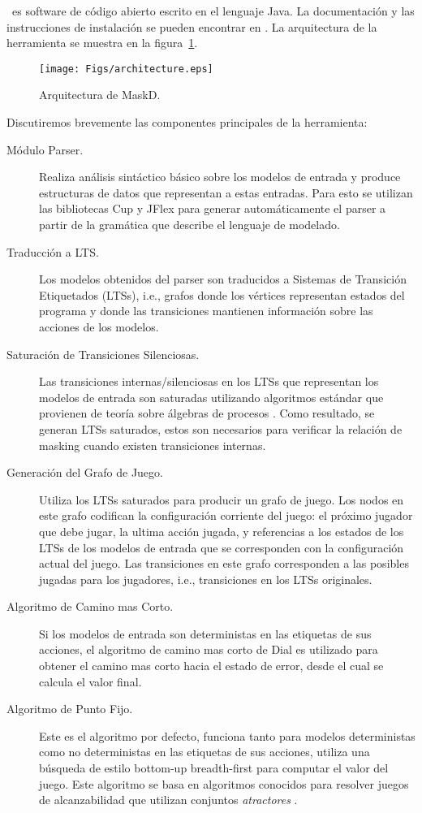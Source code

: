 \MaskD~es software de código abierto escrito en el lenguaje \textsf{Java}. La documentación y las instrucciones de instalación se pueden encontrar en \cite{MaskD}. La arquitectura de la herramienta se muestra en la figura~\ref{fig:arch}.
\begin{figure}[t]
    \centering
    \texttt{[image: Figs/architecture.eps]}
    \caption{Arquitectura de \textsf{MaskD}.}\label{fig:arch}
\end{figure}
    Discutiremos brevemente las componentes principales de la herramienta:
\begin{description}
    \item[Módulo Parser.] Realiza análisis sintáctico básico sobre los modelos de entrada y produce estructuras de datos que representan a  estas entradas. Para esto se utilizan las bibliotecas \textsf{Cup} y 
    \textsf{JFlex} para generar automáticamente el parser a partir de la gramática que describe el lenguaje de modelado.
    \item[Traducción a LTS.] Los modelos obtenidos del parser son traducidos a Sistemas de Transición Etiquetados (LTSs), i.e., 
    grafos donde los vértices representan estados del programa y donde las transiciones mantienen información sobre las acciones de los modelos. 
    \item[Saturación de Transiciones Silenciosas.] Las transiciones internas/silenciosas en los LTSs que representan los modelos de entrada son saturadas utilizando algoritmos estándar que provienen de teoría sobre álgebras de procesos \cite{Milner89}. Como resultado, se generan LTSs saturados, estos son necesarios para verificar la relación de masking cuando existen transiciones internas.
    \item[Generación del Grafo de Juego.] Utiliza los LTSs saturados para producir un grafo de juego. Los nodos en este grafo codifican la configuración corriente del juego: 
    el próximo jugador que debe jugar, la ultima acción jugada, y referencias a los estados de los LTSs de los modelos de entrada que se corresponden con la configuración actual del juego. 
    Las transiciones en este grafo corresponden a las posibles jugadas para los jugadores, i.e.,  transiciones en los LTSs originales.
    \item[Algoritmo de Camino mas Corto.] Si los modelos de entrada son deterministas en las etiquetas de sus acciones, el algoritmo de camino mas corto de Dial es utilizado para obtener el camino mas corto hacia el estado de error, desde el cual se calcula el valor final.
    \item[Algoritmo de Punto Fijo.] Este es el algoritmo por defecto, funciona tanto para modelos deterministas como no deterministas en las etiquetas de sus acciones, utiliza una búsqueda de estilo bottom-up breadth-first para computar el valor del juego. 
    Este algoritmo se basa en algoritmos conocidos para resolver juegos de alcanzabilidad que utilizan conjuntos \emph{atractores} \cite{Jurd11}. 
\end{description}

